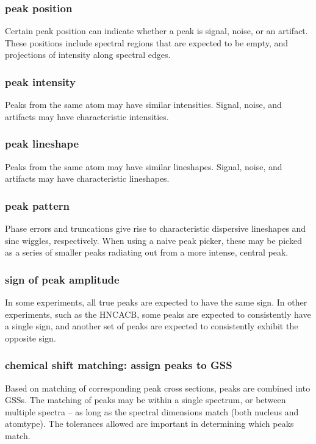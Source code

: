 \subsubsection{peak position}
Certain peak position can indicate whether a peak is signal, noise, or an 
artifact.  These positions include spectral regions that are expected to be 
empty, and projections of intensity along spectral edges.

\subsubsection{peak intensity}
Peaks from the same atom may have similar intensities. 
Signal, noise, and artifacts may have characteristic intensities.

\subsubsection{peak lineshape}
Peaks from the same atom may have similar lineshapes.
Signal, noise, and artifacts may have characteristic lineshapes.
 
\subsubsection{peak pattern}
Phase errors and truncations give rise to characteristic dispersive lineshapes
and sinc wiggles, respectively.  When using a naive peak picker, these may
be picked as a series of smaller peaks radiating out from a more intense,
central peak.

\subsubsection{sign of peak amplitude}
In some experiments, all true peaks are expected to have the same sign.  In
other experiments, such as the HNCACB, some peaks are expected to consistently
have a single sign, and another set of peaks are expected to consistently 
exhibit the opposite sign.

\subsubsection{chemical shift matching: assign peaks to GSS}
Based on matching of corresponding peak cross sections, peaks are combined into
GSSs.  The matching of peaks may be within a single spectrum, or between 
multiple spectra -- as long as the spectral dimensions match (both nucleus
and atomtype).  The tolerances allowed are important in determining which
peaks match.

